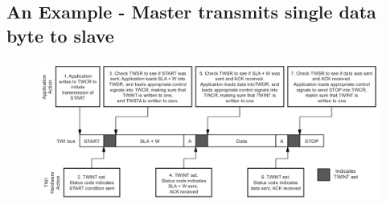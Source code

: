 \documentclass{article}
\begin{document}
\subsection{An Example - Master transmits single data byte to slave}
\begin{figure}[H]
    \centering
    \includegraphics[width=1\textwidth]{TWIExample.png}
\end{figure}
\end{document}
